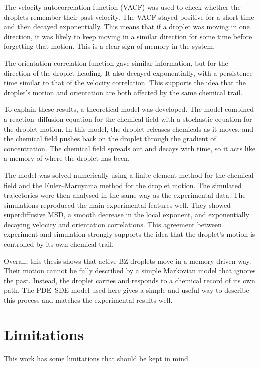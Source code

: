 The velocity autocorrelation function (VACF) was used to check whether the droplets remember their past velocity. The VACF stayed positive for a short time and then decayed exponentially. This means that if a droplet was moving in one direction, it was likely to keep moving in a similar direction for some time before forgetting that motion. This is a clear sign of memory in the system.

The orientation correlation function gave similar information, but for the direction of the droplet heading. It also decayed exponentially, with a persistence time similar to that of the velocity correlation. This supports the idea that the droplet’s motion and orientation are both affected by the same chemical trail.

To explain these results, a theoretical model was developed. The model combined a reaction--diffusion equation for the chemical field with a stochastic equation for the droplet motion\cite{droplet2025}. In this model, the droplet releases chemicals as it moves, and the chemical field pushes back on the droplet through the gradient of concentration. The chemical field spreads out and decays with time, so it acts like a memory of where the droplet has been.

The model was solved numerically using a finite element method for the chemical field and the Euler--Maruyama method for the droplet motion. The simulated trajectories were then analysed in the same way as the experimental data. The simulations reproduced the main experimental features well. They showed superdiffusive MSD, a smooth decrease in the local exponent, and exponentially decaying velocity and orientation correlations. This agreement between experiment and simulation strongly supports the idea that the droplet's motion is controlled by its own chemical trail.

Overall, this thesis shows that active BZ droplets move in a memory-driven way. Their motion cannot be fully described by a simple Markovian model that ignores the past. Instead, the droplet carries and responds to a chemical record of its own path. The PDE--SDE model used here gives a simple and useful way to describe this process and matches the experimental results well.

\section{Limitations}
\label{sec:limitations}

This work has some limitations that should be kept in mind.

